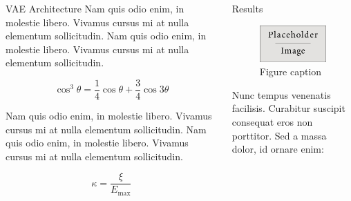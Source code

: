 \documentclass[final]{beamer}
\newlength{\onecolwid}
\newlength{\twocolwid}
\begin{document}
\begin{frame}[t]
\begin{columns}[t]
\begin{column}{\twocolwid}
\begin{columns}[t,totalwidth=\twocolwid]
\begin{column}{\onecolwid}
\begin{block}{VAE Architecture}
Nam quis odio enim, in molestie libero. Vivamus cursus mi at nulla elementum sollicitudin. Nam quis odio enim, in molestie libero. Vivamus cursus mi at nulla elementum sollicitudin.

\begin{equation}
\cos^3 \theta =\frac{1}{4}\cos\theta+\frac{3}{4}\cos 3\theta
\label{eq:refname}
\end{equation}

Nam quis odio enim, in molestie libero. Vivamus cursus mi at nulla elementum sollicitudin. Nam quis odio enim, in molestie libero. Vivamus cursus mi at nulla elementum sollicitudin.

\begin{equation}
\kappa =\frac{\xi}{E_{\mathrm{max}}} %
\end{equation}

\end{block}


\end{column} %

\begin{column}{\onecolwid} %


\begin{block}{Results}

\begin{figure}
\includegraphics[width=0.8\linewidth]{placeholder.jpg}
\caption{Figure caption}
\end{figure}

Nunc tempus venenatis facilisis. Curabitur suscipit consequat eros non porttitor. Sed a massa dolor, id ornare enim:


\end{block}
\end{column}
\end{columns}
\end{column}
\end{columns}
\end{frame}
\end{document}
